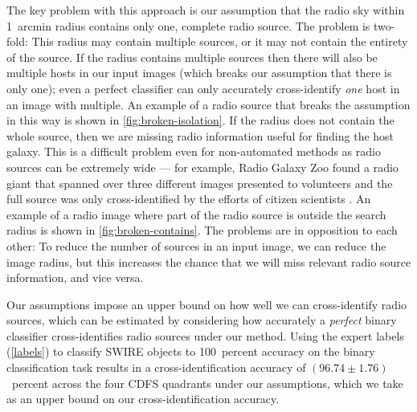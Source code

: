 \documentclass[fleqn,usenatbib,usedcolumn]{mnras}
\begin{document}
    The key problem with this approach is our assumption that the radio sky
    within 1~arcmin radius contains only one, complete radio source. The problem
    is two-fold: This radius may contain multiple sources, or it may not contain
    the entirety of the source. If the radius contains multiple sources then
    there will also be multiple hosts in our input images (which breaks our
    assumption that there is only one); even a perfect classifier can only
    accurately cross-identify \emph{one} host in an image with multiple. An
    example of a radio source that breaks the assumption in this way is shown in
    \autoref{fig:broken-isolation}. If the radius does not contain the whole
    source, then we are missing radio information useful for finding the host
    galaxy. This is a difficult problem even for non-automated methods as radio
    sources can be extremely wide --- for example, Radio Galaxy Zoo found a
    radio giant that spanned over three different images presented to volunteers
    and the full source was only cross-identified by the efforts of citizen
    scientists \citep{banfield15}. An example of a radio image where part of the
    radio source is outside the search radius is shown in
    \autoref{fig:broken-contains}. The problems are in opposition to each other:
    To reduce the number of sources in an input image, we can reduce the image
    radius, but this increases the chance that we will miss relevant radio
    source information, and vice versa.

    Our assumptions impose an upper bound on how well we can cross-identify
    radio sources, which can be estimated by considering how accurately a
    \emph{perfect} binary classifier cross-identifies radio sources under our
    method. Using the expert labels (\autoref{labels}) to classify SWIRE objects
    to 100~percent accuracy on the binary classification task results in a
    cross-identification accuracy of $(96.74 \pm 1.76)$~percent across the four
    CDFS quadrants under our assumptions, which we take as an upper bound on our
    cross-identification accuracy.
\end{document}
